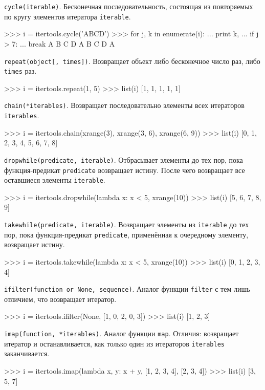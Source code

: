 \lstinline{cycle(iterable)}. Бесконечная последовательность, состоящая из повторяемых по кругу элементов итератора \lstinline{iterable}.
\begin{pylst}{}{}
>>> i = itertools.cycle('ABCD')
>>> for j, k in enumerate(i):
...     print k,
...     if j > 7:
...         break
A B C D A B C D A
\end{pylst}

\lstinline{repeat(object[, times])}. Возвращает объект либо бесконечное число раз, либо \lstinline{times} раз.
\begin{pylst}{}{}
>>> i = itertools.repeat(1, 5)
>>> list(i)
[1, 1, 1, 1, 1]
\end{pylst}

\lstinline{chain(*iterables)}. Возвращает последовательно элементы всех итераторов \lstinline{iterables}.
\begin{pylst}{}{}
>>> i = itertools.chain(xrange(3), xrange(3, 6), xrange(6, 9))
>>> list(i)
[0, 1, 2, 3, 4, 5, 6, 7, 8]
\end{pylst}

\lstinline{dropwhile(predicate, iterable)}. Отбрасывает элементы до тех пор, пока функция-предикат \lstinline{predicate} возвращает истину. После чего возвращает все оставшиеся элементы \lstinline{iterable}.
\begin{pylst}{}{}
>>> i = itertools.dropwhile(lambda x: x < 5, xrange(10))
>>> list(i)
[5, 6, 7, 8, 9]
\end{pylst}

\lstinline{takewhile(predicate, iterable)}. Возвращает элементы из \lstinline{iterable} до тех пор, пока функция-предикат \lstinline{predicate}, применённая к очередному элементу, возвращает истину.
\begin{pylst}{}{}
>>> i = itertools.takewhile(lambda x: x < 5, xrange(10))
>>> list(i)
[0, 1, 2, 3, 4]
\end{pylst}

\lstinline{ifilter(function or None, sequence)}. Аналог функции \lstinline{filter} с тем лишь отличием, что возвращает итератор.
\begin{pylst}{}{}
>>> i = itertools.ifilter(None, [1, 0, 2, 0, 3])
>>> list(i)
[1, 2, 3]
\end{pylst}

\lstinline{imap(function, *iterables)}. Аналог функции \lstinline{map}. Отличия: возвращает итератор и останавливается, как только один из итераторов \lstinline{iterables} заканчивается.
\begin{pylst}{}{}
>>> i = itertools.imap(lambda x, y: x + y, [1, 2, 3, 4], [2, 3, 4])
>>> list(i)
[3, 5, 7]
\end{pylst}

